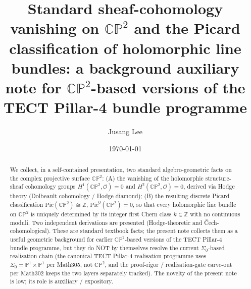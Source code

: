 



\title{Standard sheaf-cohomology vanishing on $\mathbb{CP}^2$ and the
Picard classification of holomorphic line bundles: a background
auxiliary note for $\mathbb{CP}^2$-based versions of the TECT
Pillar-4 bundle programme}

\author{Jusang Lee}

\date{\today}

\begin{abstract}
We collect, in a self-contained presentation, two standard
algebro-geometric facts on the complex projective surface
$\mathbb{CP}^2$: (A) the vanishing of the holomorphic
structure-sheaf cohomology groups $H^1(\mathbb{CP}^2, \mathcal{O}) =
0$ and $H^2(\mathbb{CP}^2, \mathcal{O}) = 0$, derived via Hodge
theory (Dolbeault cohomology / Hodge diamond); (B) the resulting
discrete Picard classification $\mathrm{Pic}(\mathbb{CP}^2) \cong
\mathbb{Z}$, $\mathrm{Pic}^0(\mathbb{CP}^2) = 0$, so that every
holomorphic line bundle on $\mathbb{CP}^2$ is uniquely determined by
its integer first Chern class $k \in \mathbb{Z}$ with no continuous
moduli. Two independent derivations are presented (Hodge-theoretic
and \v{C}ech-cohomological). These are standard textbook facts; the
present note collects them as a useful geometric background for
earlier $\mathbb{CP}^2$-based versions of the TECT Pillar-4 bundle
programme, but they do NOT by themselves resolve the current
$\Sigma_0$-based realisation chain (the canonical TECT Pillar-4
realisation programme uses $\Sigma_0 = \mathbb{P}^1 \times
\mathbb{P}^1$ per Math305, not $\mathbb{CP}^2$, and the
proof-rigor / realisation-gate carve-out per Math302 keeps the two
layers separately tracked). The novelty of the present note is low;
its role is auxiliary / expository.
\end{abstract}

